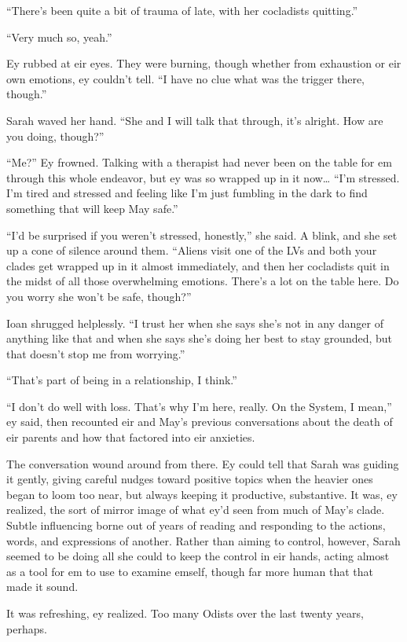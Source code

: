 ``There's been quite a bit of trauma of late, with her cocladists quitting.''

``Very much so, yeah.''

Ey rubbed at eir eyes. They were burning, though whether from exhaustion or eir own emotions, ey couldn't tell. ``I have no clue what was the trigger there, though.''

Sarah waved her hand. ``She and I will talk that through, it's alright. How are you doing, though?''

``Me?'' Ey frowned. Talking with a therapist had never been on the table for em through this whole endeavor, but ey was so wrapped up in it now\ldots{} ``I'm stressed. I'm tired and stressed and feeling like I'm just fumbling in the dark to find something that will keep May safe.''

``I'd be surprised if you weren't stressed, honestly,'' she said. A blink, and she set up a cone of silence around them. ``Aliens visit one of the LVs and both your clades get wrapped up in it almost immediately, and then her cocladists quit in the midst of all those overwhelming emotions. There's a lot on the table here. Do you worry she won't be safe, though?''

Ioan shrugged helplessly. ``I trust her when she says she's not in any danger of anything like that and when she says she's doing her best to stay grounded, but that doesn't stop me from worrying.''

``That's part of being in a relationship, I think.''

``I don't do well with loss. That's why I'm here, really. On the System, I mean,'' ey said, then recounted eir and May's previous conversations about the death of eir parents and how that factored into eir anxieties.

The conversation wound around from there. Ey could tell that Sarah was guiding it gently, giving careful nudges toward positive topics when the heavier ones began to loom too near, but always keeping it productive, substantive. It was, ey realized, the sort of mirror image of what ey'd seen from much of May's clade. Subtle influencing borne out of years of reading and responding to the actions, words, and expressions of another. Rather than aiming to control, however, Sarah seemed to be doing all she could to keep the control in eir hands, acting almost as a tool for em to use to examine emself, though far more human that that made it sound.

It was refreshing, ey realized. Too many Odists over the last twenty years, perhaps.


